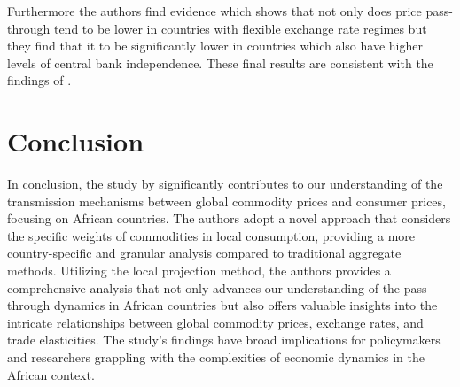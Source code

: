 \documentclass[11pt]{article}
\begin{document}
\begin{spacing}{2}
		Furthermore the authors find evidence which shows that not only does price pass-through tend to be lower in countries with flexible exchange rate regimes but they find that it to be significantly lower in countries which also have higher levels of central bank independence. These final results are consistent with the findings of \cite{ha2020inflation}. 
		

		\section{Conclusion}
		In conclusion, the study by \cite{lemaire2023international} significantly contributes to our understanding of the transmission mechanisms between global commodity prices and consumer prices, focusing on African countries. The authors adopt a novel approach that considers the specific weights of commodities in local consumption, providing a more country-specific and granular analysis compared to traditional aggregate methods. Utilizing the local projection method, the authors  provides a comprehensive analysis that not only advances our understanding of the pass-through dynamics in African countries but also offers valuable insights into the intricate relationships between global commodity prices, exchange rates, and trade elasticities. The study's findings have broad implications for policymakers and researchers grappling with the complexities of economic dynamics in the African context.
		
		\pagebreak
		\printbibliography
		
	\end{spacing}
\end{document}
